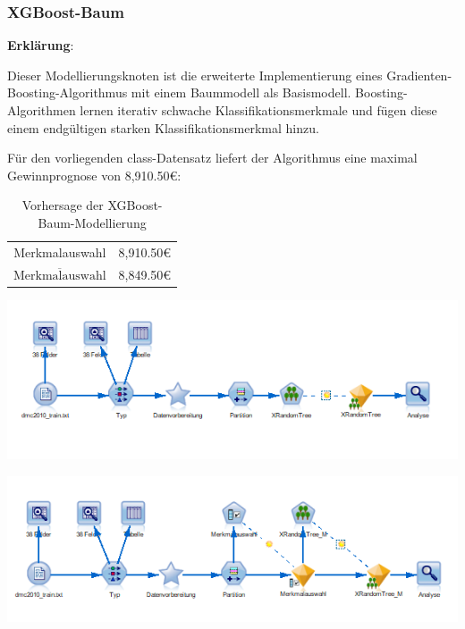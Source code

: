 \documentclass[a4paper,12pt]{article}
\newcounter{Algorithmus}
\begin{document}
\subsubsection{XGBoost-Baum}
{\bf Erklärung}:
\par
\vspace{0.2cm}
Dieser Modellierungsknoten ist die erweiterte Implementierung eines Gradienten-Boosting-Algorithmus mit einem
Baummodell als Basismodell. Boosting-Algorithmen lernen iterativ schwache Klassifikationsmerkmale
und fügen diese einem endgültigen starken Klassifikationsmerkmal hinzu.
\par
\vspace{0.2cm}
Für den vorliegenden class-Datensatz liefert der Algorithmus eine maximal Gewinnprognose von 8,910.50\;\euro\;:
\begin{table}[h]
\begin{center}
	\begin{tabular}{c | c}
	 &
	\\
	\hline
	Merkmalauswahl & 8,910.50\;\euro
	\\
	$\overline{\text{Merkmalauswahl}}$ & 8,849.50\;\euro
	\end{tabular}
\end{center}
\caption{Vorhersage der XGBoost-Baum-Modellierung}
\end{table}

\begin{center}
\includegraphics[width=\textwidth]{Screens/xrandom}
\end{center}

\begin{center}
\includegraphics[width=\textwidth]{Screens/xrandom_m}
\end{center}
\end{document}
